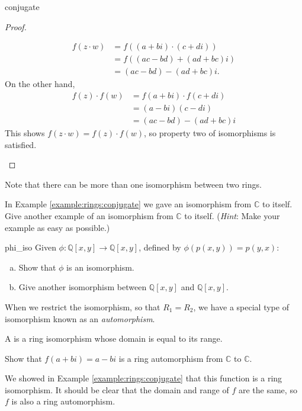 \begin{example}{conjugate}
\begin{proof}{}
\begin{enumerate}[(1)]
\begin{align*}
  f(z\cdot w)&=f((a+bi)\cdot(c+di))\\
  &=f((ac-bd)+(ad+bc)i)\\
  &=(ac-bd)-(ad+bc)i.
\end{align*}
On the other hand,
\begin{align*}
f(z)\cdot f(w)&=f(a+bi)\cdot f(c+di)\\
&=(a-bi)(c-di)\\
&=(ac-bd)-(ad+bc)i
\end{align*}
This shows $f(z\cdot w)=f(z)\cdot f(w)$, so property two of isomorphisms is satisfied.
\end{enumerate}
\end{proof}
\end{example}

Note that there can be more than one isomorphism between two rings.

\begin{exercise}{}
In Example \ref{example:rings:conjugate} we gave an isomorphism from ${\mathbb C}$ to itself.  Give another example of an isomorphism from ${\mathbb C}$ to itself.  (\emph{Hint}:  Make your example as easy as possible.)
\end{exercise}

\begin{exercise}{phi_iso}
Given $\phi:  {\mathbb Q}[x,y]\rightarrow{\mathbb Q}[x,y]$, defined by $\phi(p(x,y))=p(y,x)$:
\begin{enumerate}[(a)]
\item Show that $\phi$ is an isomorphism.
\item Give another isomorphism between ${\mathbb Q}[x,y]$ and ${\mathbb Q}[x,y]$.
\end{enumerate}
\end{exercise}

When we restrict the isomorphism, so that $R_1=R_2$, we have a special type of isomorphism known as an \emph{automorphism}.

\begin{defn}\label{automorphism}
A  is a ring isomorphism whose domain is equal to its range.
\end{defn}

\begin{example}{}
Show that $f(a+bi)=a-bi$ is a ring automorphism from ${\mathbb C}$ to ${\mathbb C}$.

We showed in Example \ref{example:rings:conjugate} that this function is a ring isomorphism.  It should be clear that the domain and range of $f$ are the same, so $f$ is also a ring automorphism.  
\end{example}

